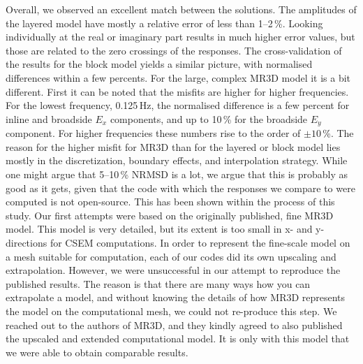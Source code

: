 \documentclass[onecolumn,extra,camera]{gji}
\begin{document}
Overall, we observed an excellent match between the solutions. The amplitudes of the layered model have mostly a relative error of less than 1--2\,\%. Looking individually at the real or imaginary part results in much higher error values, but those are related to the zero crossings of the responses. The cross-validation of the results for the block model yields a similar picture, with normalised differences within a few percents. For the large, complex MR3D model it is a bit different. First it can be noted that the misfits are higher for higher frequencies. For the lowest frequency, 0.125\,Hz, the normalised difference is a few percent for inline and broadside $E_x$ components, and up to 10\,\% for the broadside $E_y$ component. For higher frequencies these numbers rise to the order of $\pm10\,$\%. The reason for the higher misfit for MR3D than for the layered or block model lies mostly in the discretization, boundary effects, and interpolation strategy. While one might argue that 5--10\,\% NRMSD is a lot, we argue that this is probably as good as it gets, given that the code with which the responses we compare to were computed is not open-source. This has been shown within the process of this study. Our first attempts were based on the originally published, fine MR3D model. This model is very detailed, but its extent is too small in x- and y-directions for CSEM computations. In order to represent the fine-scale model on a mesh suitable for computation, each of our codes did its own upscaling and extrapolation. However, we were unsuccessful in our attempt to reproduce the published results.  The reason is that there are many ways how you can extrapolate a model, and without knowing the details of how MR3D represents the model on the computational mesh, we could not re-produce this step. We reached out to the authors of MR3D, and they kindly agreed to also published the upscaled and extended computational model. It is only with this model that we were able to obtain comparable results.
\end{document}
